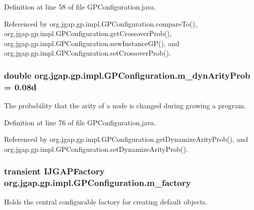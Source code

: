 Definition at line 58 of file G\-P\-Configuration.\-java.



Referenced by org.\-jgap.\-gp.\-impl.\-G\-P\-Configuration.\-compare\-To(), org.\-jgap.\-gp.\-impl.\-G\-P\-Configuration.\-get\-Crossover\-Prob(), org.\-jgap.\-gp.\-impl.\-G\-P\-Configuration.\-new\-Instance\-G\-P(), and org.\-jgap.\-gp.\-impl.\-G\-P\-Configuration.\-set\-Crossover\-Prob().

\hypertarget{classorg_1_1jgap_1_1gp_1_1impl_1_1_g_p_configuration_a0256459404ad8e7af4d6b103eabb90d4}{
\subsubsection[{m\-\_\-dyn\-Arity\-Prob}]{\setlength{\rightskip}{0pt plus 5cm}double org.\-jgap.\-gp.\-impl.\-G\-P\-Configuration.\-m\-\_\-dyn\-Arity\-Prob = 0.\-08d\hspace{0.3cm}{\ttfamily [private]}}}\label{classorg_1_1jgap_1_1gp_1_1impl_1_1_g_p_configuration_a0256459404ad8e7af4d6b103eabb90d4}
The probability that the arity of a node is changed during growing a program. 

Definition at line 76 of file G\-P\-Configuration.\-java.



Referenced by org.\-jgap.\-gp.\-impl.\-G\-P\-Configuration.\-get\-Dynamize\-Arity\-Prob(), and org.\-jgap.\-gp.\-impl.\-G\-P\-Configuration.\-set\-Dynamize\-Arity\-Prob().

\hypertarget{classorg_1_1jgap_1_1gp_1_1impl_1_1_g_p_configuration_a27716ebd3d6bc8304b60127b8f87d46a}{
\subsubsection[{m\-\_\-factory}]{\setlength{\rightskip}{0pt plus 5cm}transient {\bf I\-J\-G\-A\-P\-Factory} org.\-jgap.\-gp.\-impl.\-G\-P\-Configuration.\-m\-\_\-factory\hspace{0.3cm}{\ttfamily [private]}}}\label{classorg_1_1jgap_1_1gp_1_1impl_1_1_g_p_configuration_a27716ebd3d6bc8304b60127b8f87d46a}
Holds the central configurable factory for creating default objects.

